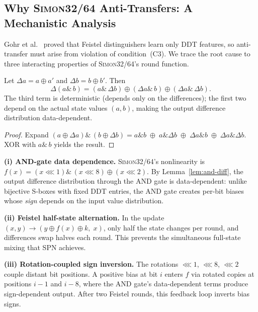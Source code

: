 \documentclass[runningheads]{llncs}
\newcommand{\simon}{\textsc{Simon32/64}\xspace}
\begin{document}
\subsection{Why \simon Anti-Transfers: A Mechanistic Analysis}
\label{sec:simon-why}

Gohr et al.~\cite{gohr2022assessment} proved that Feistel distinguishers learn only DDT features, so anti-transfer must arise from violation of condition~(C3).
We trace the root cause to three interacting properties of \simon's round function.

\begin{lemma}
\label{lem:and-diff}
Let $\Delta a = a \oplus a'$ and $\Delta b = b \oplus b'$. Then
\begin{equation}\label{eq:and-diff}
  \Delta(a \mathbin{\&}\, b) = (a \mathbin{\&}\, \Delta b)
  \oplus (\Delta a \mathbin{\&}\, b)
  \oplus (\Delta a \mathbin{\&}\, \Delta b).
\end{equation}
The third term is deterministic (depends only on the differences);
the first two depend on the actual state values $(a,b)$,
making the output difference distribution data-dependent.
\end{lemma}

\begin{proof}
Expand $(a \oplus \Delta a) \mathbin{\&}\, (b \oplus \Delta b)
= a{\mathbin{\&}}b \;\oplus\; a{\mathbin{\&}}\Delta b
\;\oplus\; \Delta a{\mathbin{\&}}b
\;\oplus\; \Delta a{\mathbin{\&}}\Delta b$.
XOR with $a \mathbin{\&}\, b$ yields the result.
\end{proof}

\textbf{(i) AND-gate data dependence.}
\simon's nonlinearity is $f(x) = (x \lll 1) \mathbin{\&}\, (x \lll 8) \oplus (x \lll 2)$.
By Lemma~\ref{lem:and-diff}, the output difference distribution through the AND gate is data-dependent: unlike bijective S-boxes with fixed DDT entries, the AND gate creates per-bit biases whose \emph{sign} depends on the input value distribution.

\textbf{(ii) Feistel half-state alternation.}
In the update $(x, y) \to (y \oplus f(x) \oplus k, \; x)$, only half the state changes per round, and differences swap halves each round.
This prevents the simultaneous full-state mixing that SPN achieves.

\textbf{(iii) Rotation-coupled sign inversion.}
The rotations $\lll 1$, $\lll 8$, $\lll 2$ couple distant bit positions.
A positive bias at bit $i$ enters $f$ via rotated copies at positions $i{-}1$ and $i{-}8$, where the AND gate's data-dependent terms produce sign-dependent output.
After two Feistel rounds, this feedback loop inverts bias signs.
\end{document}
